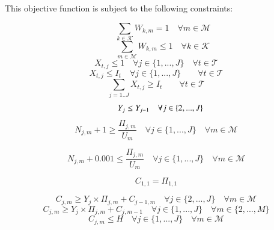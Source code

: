 \documentclass[review,12pt, 3p, times]{elsarticle}
\begin{document}
This objective function is subject to the following constraints:
\begin{spacing}{.5}	
	\begin{equation}
		\begin{array}{ll}		
			  &   
		\end{array}
		{{\sum_{k\in \mathcal{K}}W_{k,m}}=1 \quad \forall{ m \in  \mathcal{M}}}
		\label{c3}
	\end{equation}
	\begin{equation}
		\begin{array}{ll}
			  &   
		\end{array}
		{{\sum_{m\in \mathcal{M}}W_{k,m}}\leq 1 \quad \forall{ k \in  \mathcal{K}}}
		\label{c4}
	\end{equation}
	\begin{equation}\label{c5}
		X_{t,j}  \leq 1  \quad\forall j \in \{1,...,J\}\quad\forall{t\in\mathcal{T}}
	\end{equation} 
	\begin{equation}\label{c6}
		X_{t,j}  \leq I_t  \quad\forall j \in \{1,...,J\} \quad \quad\forall{t\in\mathcal{T}}
	\end{equation} 
	\begin{equation}\label{c7}
		{{\sum_{j=1..J} X_{t,j} }   \geq I_t   \quad \quad\forall{t\in\mathcal{T}}}
	\end{equation} 
	\begin{equation}\label{c8}
		\text{\quad }  Y_j\leq Y_{j-1} \quad\forall j \in \{2,...,J\}
	\end{equation}									 
	\begin{equation}\label{c9} 
		N_{j,m} +1 \geq \frac{\Pi_{j,m}}{U_m}  \quad\forall j \in \{1,...,J\}  \quad\forall m\in\mathcal{M}
	\end{equation}
											
	\begin{equation}\label{c10} 
		N_{j,m}  + 0.001  \leq \frac{\Pi_{j,m}}{U_m}  \quad\forall j \in \{1,...,J\} \quad\forall m\in\mathcal{M}
	\end{equation}
											 
	\begin{equation}\label{c11}
		C_{1,1} = \Pi_{1,1} 
	\end{equation}
																				
	\begin{equation}\label{c12}
		C_{j,m} \geq Y_j\times\Pi_{j,m}+C_{j-1,m}\quad\forall j \in \{2,...,J\}\quad\forall{m\in\mathcal{M}}
	\end{equation} 
	\begin{equation}\label{c13}
		C_{j,m} \geq Y_j\times\Pi_{j,m}+C_{j,m-1}  \quad\forall j \in \{1,...,J\} \quad\forall m \in \{2, ..., M\}
	\end{equation} 			
	\begin{equation}\label{c14}
		C_{j,m} \leq H\quad\forall j \in \{1,...,J\}\quad\forall{ m \in\mathcal{M}} 
	\end{equation} 	
						
\end{spacing}
					
\end{document}
